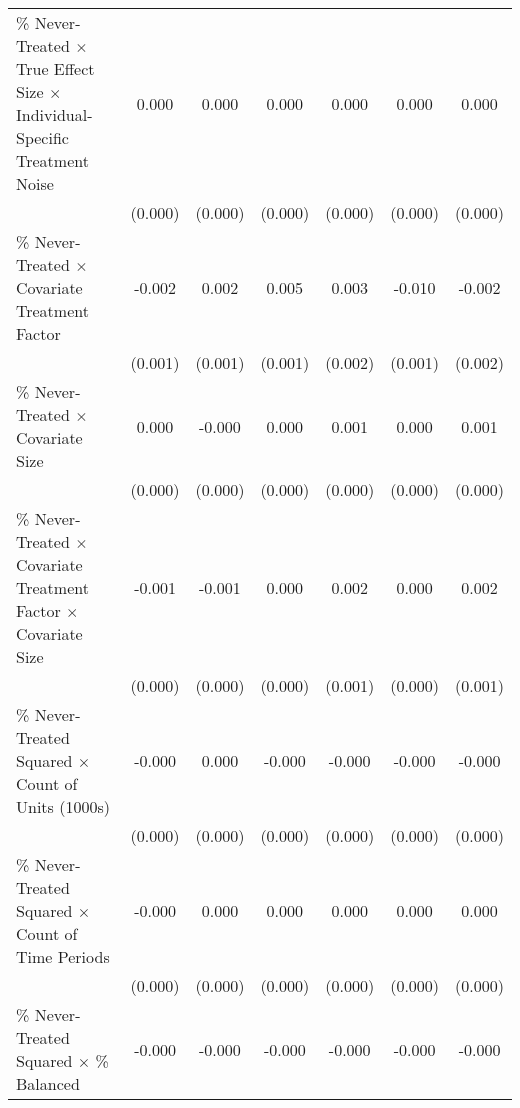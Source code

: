 \begin{table}[htbp]
{\begin{tabular}{p{4.5in}|*{6}{c}}
\% Never-Treated $\times$ True Effect Size $\times$ Individual-Specific Treatment Noise&       0.000         &       0.000\sym{**} &       0.000         &       0.000         &       0.000         &       0.000         \\
                    &     (0.000)         &     (0.000)         &     (0.000)         &     (0.000)         &     (0.000)         &     (0.000)         \\
\% Never-Treated $\times$ Covariate Treatment Factor&      -0.002\sym{***}&       0.002\sym{*}  &       0.005\sym{***}&       0.003         &      -0.010\sym{***}&      -0.002         \\
                    &     (0.001)         &     (0.001)         &     (0.001)         &     (0.002)         &     (0.001)         &     (0.002)         \\
\% Never-Treated $\times$ Covariate Size&       0.000         &      -0.000         &       0.000         &       0.001\sym{*}  &       0.000         &       0.001\sym{*}  \\
                    &     (0.000)         &     (0.000)         &     (0.000)         &     (0.000)         &     (0.000)         &     (0.000)         \\
\% Never-Treated $\times$ Covariate Treatment Factor $\times$ Covariate Size&      -0.001\sym{***}&      -0.001\sym{**} &       0.000         &       0.002\sym{*}  &       0.000         &       0.002\sym{***}\\
                    &     (0.000)         &     (0.000)         &     (0.000)         &     (0.001)         &     (0.000)         &     (0.001)         \\
\% Never-Treated Squared $\times$ Count of Units (1000s)&      -0.000         &       0.000         &      -0.000         &      -0.000         &      -0.000         &      -0.000         \\
                    &     (0.000)         &     (0.000)         &     (0.000)         &     (0.000)         &     (0.000)         &     (0.000)         \\
\% Never-Treated Squared $\times$ Count of Time Periods&      -0.000         &       0.000         &       0.000\sym{***}&       0.000\sym{***}&       0.000\sym{***}&       0.000\sym{***}\\
                    &     (0.000)         &     (0.000)         &     (0.000)         &     (0.000)         &     (0.000)         &     (0.000)         \\
\% Never-Treated Squared $\times$ \% Balanced&      -0.000\sym{***}&      -0.000\sym{***}&      -0.000\sym{***}&      -0.000\sym{***}&      -0.000\sym{***}&      -0.000\sym{***}\\

\end{tabular}}
\end{table}
